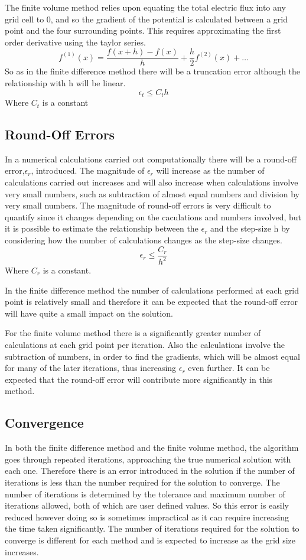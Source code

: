 \documentclass[aps,twocolumn,pre,nofootinbib]{revtex4}
\begin{document}
The finite volume method relies upon equating the total electric flux into any grid cell to 0, and so the gradient of the potential is calculated between a grid point and the four surrounding points. This requires approximating the first order derivative using the taylor series.
\[f^{(1)}(x) = \frac{f(x+h) - f(x)}{h} + \frac{h}{2}f^{(2)}(x) + \dots\]
So as in the finite difference method there will be a truncation error although the relationship with h will be linear.
\[\epsilon_t \leq C_th \]
Where \(C_t\) is a constant



\subsection{Round-Off Errors}

In a numerical calculations carried out computationally there will be a round-off error,\(\epsilon_r\), introduced. The magnitude of \(\epsilon_r\) will increase as the number of calculations carried out increases and will also increase when calculations involve very small numbers, such as subtraction of almost equal numbers and division by very small numbers. The magnitude of round-off errors is very difficult to quantify since it changes depending on the caculations and numbers involved, but it is possible to estimate the relationship between the \(\epsilon_r\) and the step-size h by considering how the number of calculations changes as the step-size changes.
\[\epsilon_r \leq \frac{C_r}{h^2} \]
Where \(C_r\) is a constant.

In the finite difference method the number of calculations performed at each grid point is relatively small and therefore it can be expected that the round-off error will have quite a small impact on the solution. 

For the finite volume method there is a significantly greater number of calculations at each grid point per iteration. Also the calculations involve the subtraction of numbers, in order to find the gradients, which will be almost equal for many of the later iterations, thus increasing \(\epsilon_r\) even further. It can be expected that the round-off error will contribute more significantly in this method.


\subsection{Convergence}

In both the finite difference method and the finite volume method, the algorithm goes through repeated iterations, approaching the true numerical solution with each one. Therefore there is an error introduced in the solution if the number of iterations is less than the number required for the solution to converge. The number of iterations is determined by the tolerance and maximum number of iterations allowed, both of which are user defined values. So this error is easily reduced however doing so is sometimes impractical as it can require increasing the time taken significantly. The number of iterations required for the solution to converge is different for each method and is expected to increase as the grid size increases.
\end{document}
